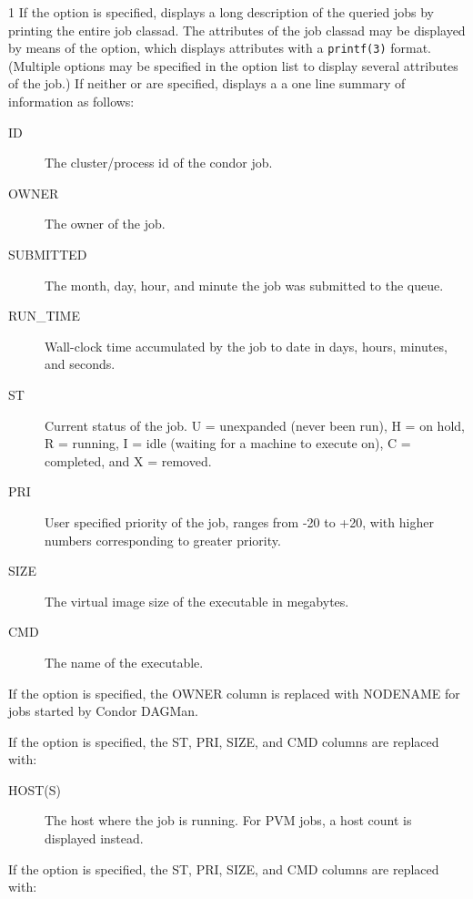 \begin{ManPage}{\label{man-condor-q}}{1}
If the  option is specified,  displays a long description 
of the queried jobs by printing the entire job classad.
The attributes of the job classad may be displayed by means of the
 option, which displays attributes with a \verb+printf(3)+
format.
(Multiple  options may be specified in the option list to display
several attributes of the job.)
If neither  or  are specified,  displays a 
a one line summary of information as follows:

\begin{description}
\item[ID] The cluster/process id of the condor job. 
\item[OWNER] The owner of the job. 
\item[SUBMITTED] The month, day, hour, and minute the job was submitted to the 
	queue. 
\item[RUN\_TIME]  Wall-clock time accumulated by the job to date in days, 
	hours, minutes, and seconds.  
\item[ST] Current status of the job. U = unexpanded (never been run), H = on hold,
	R = running, I = idle (waiting for a machine to execute on), C = completed, 
	and X = removed. 
\item[PRI] User specified priority of the job, ranges from -20 to +20, with 
	higher numbers corresponding to greater priority. 
\item[SIZE] The virtual image size of the executable in megabytes. 
\item[CMD] The name of the executable. 
\end{description}

If the  option is specified, the OWNER column is replaced
with NODENAME for jobs started by Condor DAGMan.


If the  option is specified, the ST, PRI, SIZE, and CMD
columns are replaced with:

\begin{description}
\item[HOST(S)] The host where the job is running.  For PVM jobs, a
host count is displayed instead.
\end{description}

If the  option is specified, the ST, PRI, SIZE, and CMD
columns are replaced with:


\end{ManPage}
